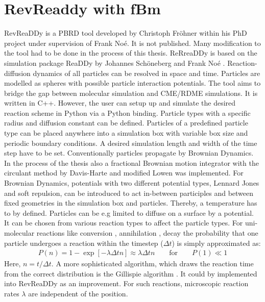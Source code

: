 \documentclass[
  a4paper,BCOR10mm,twoside,
  headsepline,footsepline,%
  fleqn,openbib
]{scrbook}
\begin{document}
\section{RevReaddy with fBm} 
RevReaDDy is a PBRD tool developed by Christoph Fröhner within his PhD project under supervision of Frank Noé. It is not published. Many modification to the tool had to be done in the process of this thesis. ReRreaDDy is based on the simulation package ReaDDy by Johannes Schöneberg and Frank Noé \cite{10.1371/journal.pone.0074261}. Reaction-diffusion dynamics of all particles can be resolved in space and time. Particles are modelled as spheres with possible particle interaction potentials. The tool aims to bridge the gap between molecular simulation and CME/RDME simulations. It is written in C++. However, the user can setup up and simulate the desired reaction scheme in Python via a Python binding. Particle types with a specific radius and diffusion constant can be defined. Particles of a predefined particle type can be placed anywhere into a simulation box with variable box size and periodic boundary conditions. A desired simulation length and width of the time step have to be set. Conventionally particles propagate by Brownian Dynamics. In the process of the thesis also a fractional Brownian motion integrator with the circulant method by Davis-Harte \cite{Dieker2004}  and modified Lowen \cite{Lowen1999} was implemented. For Brownian Dynamics, potentials with two different potential types, Lennard Jones and soft repulsion, can be introduced to act in-between participles and between fixed geometries in the simulation box and particles. Thereby, a temperature has to by defined. Particles can be e.g limited to diffuse on a surface by a potential. It can be chosen from various reaction types to affect the particle types. For uni-molecular reactions like conversion , annihilation , decay  the probability that one particle undergoes a reaction within the timestep ($\Delta t$) is simply approximated as:
\begin{align} \label{propabilityreaction}
 P(n)=1- \exp[-\lambda \Delta t n] \approx \lambda \Delta t n \qquad \text{for} \qquad P(1)\ll 1
\end{align}
Here, $n=t/\Delta t$. A more sophisticated algorithm, which draws the reaction time from the correct distribution is the Gillispie algorithm \cite{Gillespie1977}. It could by implemented into RevReaDDy as an improvement. For such reactions,  microscopic reaction rates $\lambda$ are independent of the position.
\end{document}
